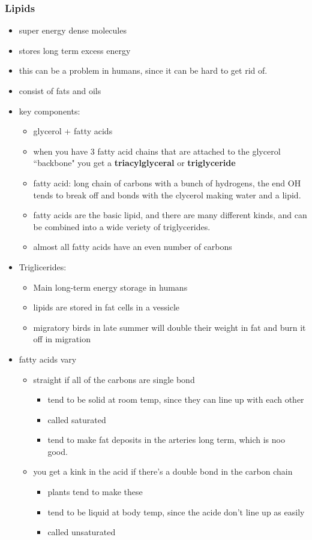 \documentclass{article}
\theoremstyle{definition}
\begin{document}
\subsubsection{Lipids}
\begin{itemize}
	\item super energy dense molecules
	\item stores long term excess energy
	\item this can be a problem in humans, since it can be hard to get rid of.
	\item consist of fats and oils
	\item key components:
		\begin{itemize}
			\item glycerol + fatty acids
			\item when you have 3 fatty acid chains that are attached to the glycerol ``backbone" you get a \textbf{triacylglyceral}  or \textbf{triglyceride} 
			\item fatty acid: long chain of carbons with a bunch of hydrogens, the end OH tends to break off and bonds with the clycerol making water and a lipid.
			\item fatty acids are the basic lipid, and there are many different kinds, and can be combined into a wide veriety of triglycerides.
			\item almost all fatty acids have an even number of carbons
		\end{itemize}
	\item Triglicerides:
		\begin{itemize}
			\item Main long-term energy storage in humans
			\item lipids are stored in fat cells in a vessicle
			\item migratory birds in late summer will double their weight in fat and burn it off in migration
		\end{itemize}
	\item fatty acids vary
		\begin{itemize}
			\item straight if all of the carbons are single bond
				\begin{itemize}
					\item tend to be solid at room temp, since they can line up with each other
					\item called saturated
					\item tend to make fat deposits in the arteries long term, which is noo good.
				\end{itemize}
			\item you get a kink in the acid if there's a double bond in the carbon chain
				\begin{itemize}
					\item plants tend to make these
					\item tend to be liquid at body temp, since the acide don't line up as easily
					\item called unsaturated
				\end{itemize}
		\end{itemize}
\end{itemize}
\end{document}
